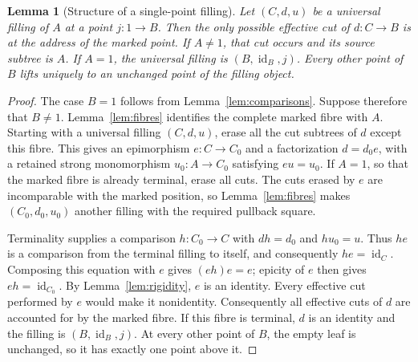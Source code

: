 \documentclass[11pt,a4paper]{article}
\theoremstyle{plain}
\newtheorem{lemma}[theorem]{Lemma}
\theoremstyle{definition}
\theoremstyle{remark}
\newcommand{\one}{1}
\newcommand{\id}{\operatorname{id}}
\begin{document}
\begin{lemma}[Structure of a single-point filling]\label{lem:singlecut}
Let $(C,d,u)$ be a universal filling of $A$ at a point
$j:\one\to B$. Then the only possible effective cut of $d:C\to B$ is at the
address of the marked point. If $A\ne\one$, that cut occurs and
its source subtree is $A$. If $A=\one$, the universal filling is
$(B,\id_B,j)$. Every other point of $B$ lifts uniquely to an unchanged
point of the filling object.
\end{lemma}
\begin{proof}
The case $B=\one$ follows from Lemma~\ref{lem:comparisons}.
Suppose therefore that $B\ne\one$. Lemma~\ref{lem:fibres}
identifies the complete marked fibre with $A$. Starting with a
universal filling $(C,d,u)$, erase all the cut subtrees
of $d$ except this fibre. This gives an epimorphism $e:C\to C_0$ and a
factorization $d=d_0e$, with a retained strong monomorphism $u_0:A\to C_0$
satisfying $eu=u_0$. If $A=\one$, so that the marked fibre is already terminal,
erase all cuts.
The cuts erased by $e$ are incomparable with the marked position, so
Lemma~\ref{lem:fibres} makes $(C_0,d_0,u_0)$ another filling with the required pullback square.

Terminality supplies a comparison $h:C_0\to C$ with
$dh=d_0$ and $hu_0=u$. Thus $he$ is a comparison from the
terminal filling to itself, and consequently $he=\id_C$.
Composing this equation with $e$ gives $(eh)e=e$; epicity of $e$
then gives $eh=\id_{C_0}$. By Lemma~\ref{lem:rigidity}, $e$ is
an identity.
Every effective cut performed by $e$ would make it nonidentity.
Consequently all effective cuts of $d$ are accounted for by the
marked fibre. If this fibre is terminal, $d$ is an identity and
the filling is $(B,\id_B,j)$. At every other point of $B$, the
empty leaf is unchanged, so it has exactly one point above it.
\end{proof}
\end{document}
